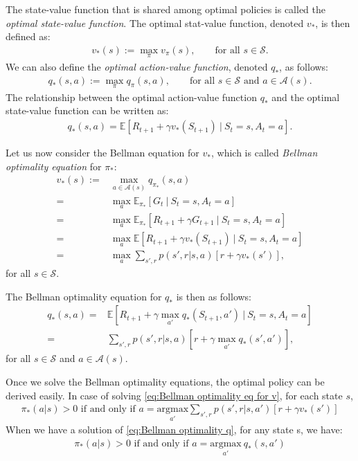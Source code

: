 The state-value function that is shared among optimal policies is called the \textit{optimal state-value function}. The optimal stat-value function, denoted $v_*$, is then defined as:
\begin{align}
    v_*(s) := \max_\pi v_\pi(s), \qquad \text{for all } s\in\mathcal{S}.
\end{align}
We can also define the \textit{optimal action-value function}, denoted $q_*$, as follows:
\begin{align}
    q_*(s,a) := \max_\pi q_\pi(s,a),\qquad \text{for all } s\in\mathcal{S} \text{ and } a\in\mathcal{A}(s).
\end{align}
The relationship between the optimal action-value function $q_\ast$ and the optimal state-value function can be written as:
\begin{align}
    q_*(s,a) = \mathbb{E}[R_{t+1} + \gamma v_\ast(S_{t+1}) \ | \ S_t = s, A_t = a].
\end{align}

Let us now consider the Bellman equation for $v_\ast$, which is called \textit{Bellman optimality equation} for $\pi_\ast$:
\begin{align}
    v_\ast(s) :=& \max_{a\in\mathcal{A}(s)} q_{\pi_\ast}(s,a)\nonumber\\
    =& \max_a \mathbb{E}_{\pi_\ast}[G_t \ | \ S_t = s, A_t = a]\nonumber\\
    =& \max_a \mathbb{E}_{\pi_\ast}[R_{t+1} + \gamma G_{t+1} \ | \ S_t = s, A_t = a]\nonumber\\
    =& \max_a \mathbb{E}[R_{t+1} + \gamma v_\ast(S_{t+1}) \ | \ S_t = s, A_t = a]\\
    =& \max_a \sum_{s',r}p(s',r|s,a)[r+\gamma v_\ast(s')],\label{eq:Bellman optimality eq for v}
\end{align}
for all $s \in \mathcal{S}$.

The Bellman optimality equation for $q_\ast$ is then as follows:
\begin{align}
\label{eq:Bellman optimality q}
    q_\ast(s,a) =& \mathbb{E}\left[ R_{t+1} + \gamma \max_{a'}q_\ast(S_{t+1},a') \ | \ S_t = s, A_t = a \right]\nonumber\\
    =& \sum_{s',r}p(s',r|s,a)[r+\gamma \max_{a'}q_\ast(s',a')],
\end{align}
for all $s\in\mathcal{S}$ and $a\in\mathcal{A}(s)$.

Once we solve the Bellman optimality equations, the optimal policy can be derived easily. In case of solving \eqref{eq:Bellman optimality eq for v}, for each state $s$,
\begin{align*}
    \pi_\ast(a|s) > 0 \text{ if and only if } a = \underset{a'}{\text{argmax}}\sum_{s',r}p(s',r|s,a')[r+\gamma v_\ast(s')]
\end{align*}
When we have a solution of \eqref{eq:Bellman optimality q}, for any state s, we have:
\begin{align*}
    \pi_\ast(a|s) > 0 \text{ if and only if } a = \underset{a'}{\text{argmax}} \ q_\ast(s,a')
\end{align*}

